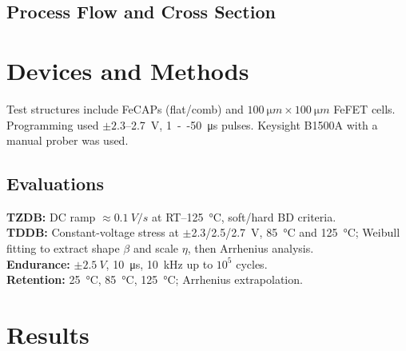 \documentclass[conference]{IEEEtran}
\begin{document}
\subsection{Process Flow and Cross Section}


\section{Devices and Methods}
Test structures include FeCAPs (flat/comb) and \(\SI{100}{\micro m}\times\SI{100}{\micro m}\) FeFET cells.
Programming used \(\pm 2.3\)–\SI{2.7}{V}, \SI{1}{--}\SI{50}{\micro s} pulses. Keysight B1500A with a manual prober was used.

\subsection{Evaluations}
\textbf{TZDB:} DC ramp \(\approx\SI{0.1}{V/s}\) at RT–\SI{125}{\celsius}, soft/hard BD criteria.\\
\textbf{TDDB:} Constant-voltage stress at \(\pm\)2.3/2.5/2.7~V, \SI{85}{\celsius} and \SI{125}{\celsius}; Weibull fitting to extract shape \(\beta\) and scale \(\eta\), then Arrhenius analysis.\\
\textbf{Endurance:} \(\pm\SI{2.5}{V}\), \SI{10}{\micro s}, \SI{10}{kHz} up to \(10^{5}\) cycles.\\
\textbf{Retention:} \SI{25}{\celsius}, \SI{85}{\celsius}, \SI{125}{\celsius}; Arrhenius extrapolation.

\section{Results}
\end{document}
